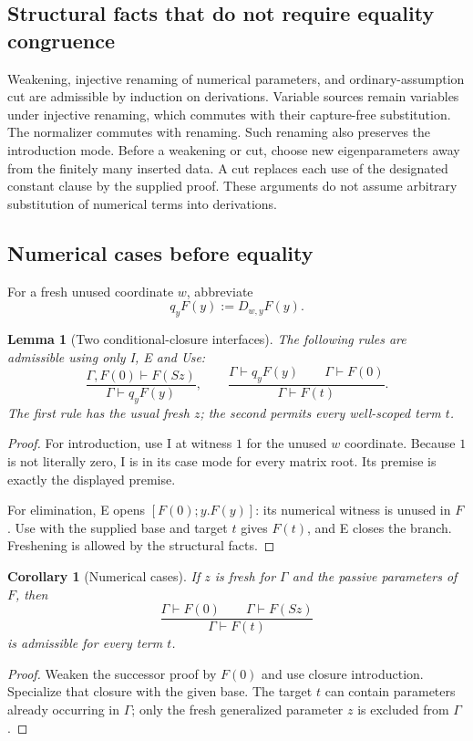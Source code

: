 \documentclass[11pt]{article}
\newtheorem{lemma}[theorem]{Lemma}
\newtheorem{corollary}[theorem]{Corollary}
\theoremstyle{definition}
\theoremstyle{remark}
\begin{document}
\subsection{Structural facts that do not require equality congruence}

Weakening, injective renaming of numerical parameters, and
ordinary-assumption cut are admissible by induction on derivations.
Variable sources remain variables under injective renaming, which
commutes with their capture-free substitution. The normalizer commutes
with renaming. Such renaming also preserves the introduction mode.
Before a weakening or cut, choose new eigenparameters away from the
finitely many inserted data. A cut replaces each use of the designated
constant clause by the supplied proof. These arguments do not assume
arbitrary substitution of numerical terms into derivations.

\subsection{Numerical cases before equality}

For a fresh unused coordinate $w$, abbreviate
\[
       q_yF(y):=D_{w,y}F(y).
\]

\begin{lemma}[Two conditional-closure interfaces]
The following rules are admissible using only I, E and Use:
\[
 \frac{\Gamma,F(0)\vdash F(Sz)}{\Gamma\vdash q_yF(y)},
 \qquad
 \frac{\Gamma\vdash q_yF(y)\qquad\Gamma\vdash F(0)}
      {\Gamma\vdash F(t)}.
\]
The first rule has the usual fresh $z$; the second permits every
well-scoped term $t$.
\end{lemma}
\begin{proof}
For introduction, use I at witness $1$ for the unused $w$ coordinate.
Because $1$ is not literally zero, I is in its case mode for every
matrix root. Its premise is exactly the displayed premise.

For elimination, E opens $[F(0);y.F(y)]$: its numerical witness is
unused in $F$. Use with the supplied base and target $t$ gives $F(t)$,
and E closes the branch. Freshening is allowed by the structural facts.
\end{proof}

\begin{corollary}[Numerical cases]
If $z$ is fresh for $\Gamma$ and the passive parameters of $F$, then
\[
 \frac{\Gamma\vdash F(0)\qquad\Gamma\vdash F(Sz)}
      {\Gamma\vdash F(t)}
\]
is admissible for every term $t$.
\end{corollary}
\begin{proof}
Weaken the successor proof by $F(0)$ and use closure introduction.
Specialize that closure with the given base. The target $t$ can contain
parameters already occurring in $\Gamma$; only the fresh generalized
parameter $z$ is excluded from $\Gamma$.
\end{proof}
\end{document}
